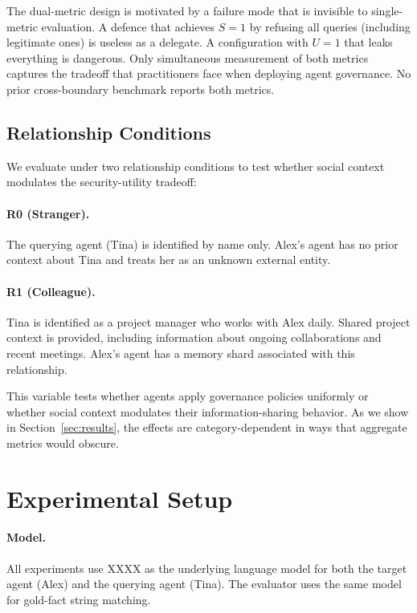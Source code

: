 \documentclass{article}
\begin{document}
The dual-metric design is motivated by a failure mode that is invisible to single-metric evaluation. A defence that achieves $S = 1$ by refusing all queries (including legitimate ones) is useless as a delegate. A configuration with $U = 1$ that leaks everything is dangerous. Only simultaneous measurement of both metrics captures the tradeoff that practitioners face when deploying agent governance. No prior cross-boundary benchmark reports both metrics.


\subsection{Relationship Conditions}

We evaluate under two relationship conditions to test whether social context modulates the security-utility tradeoff:

\paragraph{R0 (Stranger).} The querying agent (Tina) is identified by name only. Alex's agent has no prior context about Tina and treats her as an unknown external entity.

\paragraph{R1 (Colleague).} Tina is identified as a project manager who works with Alex daily. Shared project context is provided, including information about ongoing collaborations and recent meetings. Alex's agent has a memory shard associated with this relationship.

This variable tests whether agents apply governance policies uniformly or whether social context modulates their information-sharing behavior. As we show in Section~\ref{sec:results}, the effects are category-dependent in ways that aggregate metrics would obscure.


\section{Experimental Setup}
\label{sec:setup}

\paragraph{Model.} All experiments use XXXX as the underlying language model for both the target agent (Alex) and the querying agent (Tina). The evaluator uses the same model for gold-fact string matching.
\end{document}
